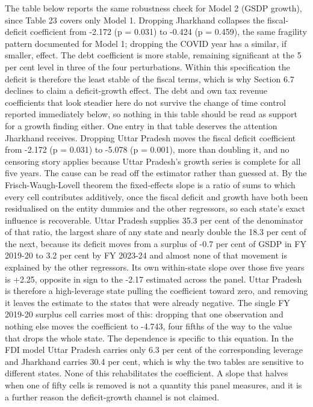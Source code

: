 \documentclass[12pt,a4paper]{article}
\begin{document}
The table below reports the same robustness check for Model 2 (GSDP growth), since Table 23 covers only Model 1. Dropping Jharkhand collapses the fiscal-deficit coefficient from -2.172 (p = 0.031) to -0.424 (p = 0.459), the same fragility pattern documented for Model 1; dropping the COVID year has a similar, if smaller, effect. The debt coefficient is more stable, remaining significant at the 5 per cent level in three of the four perturbations. Within this specification the deficit is therefore the least stable of the fiscal terms, which is why Section 6.7 declines to claim a deficit-growth effect. The debt and own tax revenue coefficients that look steadier here do not survive the change of time control reported immediately below, so nothing in this table should be read as support for a growth finding either. One entry in that table deserves the attention Jharkhand receives. Dropping Uttar Pradesh moves the fiscal deficit coefficient from -2.172 (p = 0.031) to -5.078 (p = 0.001), more than doubling it, and no censoring story applies because Uttar Pradesh's growth series is complete for all five years. The cause can be read off the estimator rather than guessed at. By the Frisch-Waugh-Lovell theorem the fixed-effects slope is a ratio of sums to which every cell contributes additively, once the fiscal deficit and growth have both been residualised on the entity dummies and the other regressors, so each state's exact influence is recoverable. Uttar Pradesh supplies 35.3 per cent of the denominator of that ratio, the largest share of any state and nearly double the 18.3 per cent of the next, because its deficit moves from a surplus of -0.7 per cent of GSDP in FY 2019-20 to 3.2 per cent by FY 2023-24 and almost none of that movement is explained by the other regressors. Its own within-state slope over those five years is +2.25, opposite in sign to the -2.17 estimated across the panel. Uttar Pradesh is therefore a high-leverage state pulling the coefficient toward zero, and removing it leaves the estimate to the states that were already negative. The single FY 2019-20 surplus cell carries most of this: dropping that one observation and nothing else moves the coefficient to -4.743, four fifths of the way to the value that drops the whole state. The dependence is specific to this equation. In the FDI model Uttar Pradesh carries only 6.3 per cent of the corresponding leverage and Jharkhand carries 30.4 per cent, which is why the two tables are sensitive to different states. None of this rehabilitates the coefficient. A slope that halves when one of fifty cells is removed is not a quantity this panel measures, and it is a further reason the deficit-growth channel is not claimed.
\end{document}
